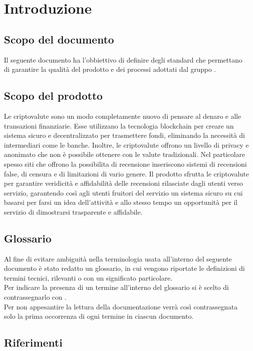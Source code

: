 \section{Introduzione}


\subsection{Scopo del documento}
Il seguente documento ha l'obbiettivo di definire degli standard che permettano
di garantire la qualità del prodotto e dei processi adottati dal gruppo \groupName. \\

\subsection{Scopo del prodotto}
Le criptovalute sono un modo completamente nuovo di pensare al denaro e alle transazioni
finanziarie. Esse utilizzano la tecnologia blockchain per creare un sistema sicuro e
decentralizzato per trasmettere fondi, eliminando la necessità di intermediari come le banche.
Inoltre, le criptovalute offrono un livello di privacy e anonimato che non è possibile
ottenere con le valute tradizionali.
Nel particolare spesso siti che offrono la possibilita di recensione inseriscono
sistemi di recensioni false, di censura e di limitazioni di vario genere.
Il prodotto sfrutta le criptovalute per garantire veridicità e affidabilità
delle recensioni rilasciate dagli utenti verso servizio, garantendo così agli utenti fruitori
del servizio un sistema sicuro su cui basarsi per farsi un idea dell'attività e allo stesso tempo
un opportunità per il servizio di dimostrarsi trasparente e affidabile.

\subsection{Glossario}
Al fine di evitare ambiguità nella terminologia usata all'interno del seguente
documento è stato redatto un glossario, in cui vengono riportate le definizioni
di termini tecnici, rilevanti o con un significato particolare. \\ Per indicare
la presenza di un termine all'interno del glossario si è scelto di
contrassegnarlo con \glo.\\ Per non appesantire la lettura della documentazione
verrà così contrassegnata solo la prima occorrenza di ogni termine in ciascun
documento.

\subsection{Riferimenti}
